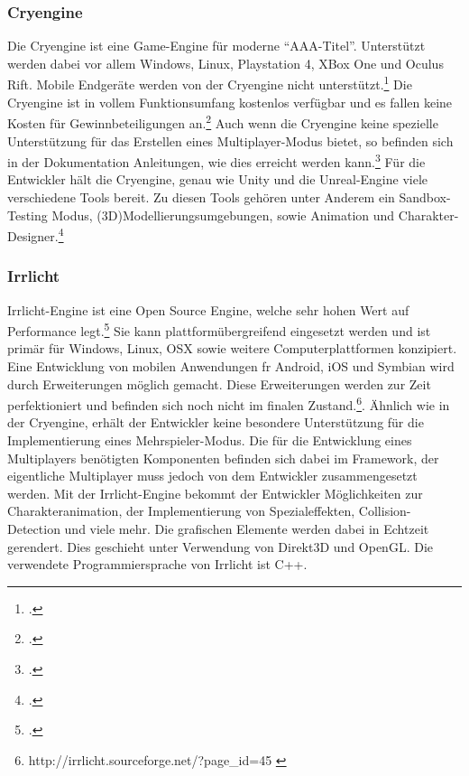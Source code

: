 	\subsubsection*{Cryengine}
	Die Cryengine ist eine Game-Engine für moderne \enquote{AAA-Titel}. Unterstützt werden dabei vor allem Windows, Linux, Playstation 4, XBox One und Oculus Rift. Mobile Endgeräte werden von der Cryengine nicht unterstützt.\footcite[\url{https://www.cryengine.com/features/platforms}]{cry-home} Die Cryengine ist in vollem Funktionsumfang kostenlos verfügbar und es fallen keine Kosten für Gewinnbeteiligungen an.\footcite[\url{https://www.cryengine.com/features}]{cry-home} Auch wenn die Cryengine keine spezielle Unterstützung für das Erstellen eines Multiplayer-Modus bietet, so befinden sich in der Dokumentation Anleitungen, wie dies erreicht werden kann.\footcite[\url{http://docs.cryengine.com/display/SDKDOC2/Multiplayer}]{cry-home} Für die Entwickler hält die Cryengine, genau wie Unity und die Unreal-Engine viele verschiedene Tools bereit. Zu diesen Tools gehören unter Anderem ein Sandbox-Testing Modus, (3D)Modellierungsumgebungen, sowie Animation und Charakter-Designer.\footcite[\url{https://www.cryengine.com/features}]{cry-home}

	\subsubsection*{Irrlicht}
	Irrlicht-Engine ist eine Open Source Engine, welche sehr hohen Wert auf Performance legt.\footcite[\url{http://irrlicht.sourceforge.net/}]{irrlicht-home} Sie kann plattformübergreifend eingesetzt werden und ist primär für Windows, Linux, OSX sowie weitere Computerplattformen konzipiert. Eine Entwicklung von mobilen Anwendungen fr Android, iOS und Symbian wird durch Erweiterungen möglich gemacht. Diese Erweiterungen werden zur Zeit perfektioniert und befinden sich noch nicht im finalen Zustand.\footnote{\label{irrlicht}http://irrlicht.sourceforge.net/?page\_id=45 \cite{irrlicht-home}}. Ähnlich wie in der Cryengine, erhält der Entwickler keine besondere Unterstützung für die Implementierung eines Mehrspieler-Modus. Die für die Entwicklung eines Multiplayers benötigten Komponenten befinden sich dabei im Framework, der eigentliche Multiplayer muss jedoch von dem Entwickler zusammengesetzt werden. Mit der Irrlicht-Engine bekommt der Entwickler Möglichkeiten zur Charakteranimation, der Implementierung von Spezialeffekten, Collision-Detection und viele mehr. Die grafischen Elemente werden dabei in Echtzeit gerendert. Dies geschieht unter Verwendung von Direkt3D und OpenGL. Die verwendete Programmiersprache von Irrlicht ist C++.

